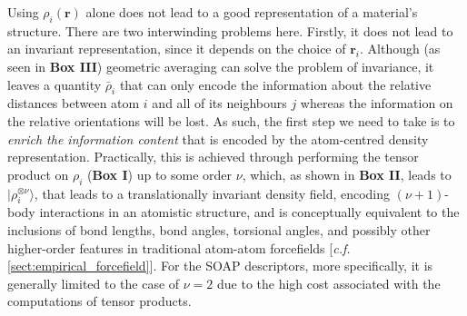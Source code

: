 Using $\rho_i(\bm{r})$ alone does not lead to a good representation of a material's structure. There are two interwinding problems here. Firstly, it does not lead to an invariant representation, since it depends on the choice of $\bm{r}_i$. Although (as seen in \textbf{Box III}) geometric averaging can solve the problem of invariance, it leaves a quantity $\bar{\rho}_i$ that can only encode the information about the relative distances between atom $i$ and all of its neighbours $j$ whereas the information on the relative orientations will be lost. As such, the first step we need to take is to \emph{enrich the information content} that is encoded by the atom-centred density representation. Practically, this is achieved through performing the tensor product on $\rho_i$ (\textbf{Box I}) up to some order $\nu$, which, as shown in \textbf{Box II}, leads to $|\rho^{\otimes \nu}_i\rangle$, that leads to a translationally invariant density field, encoding $(\nu+1)$-body interactions in an atomistic structure, and is conceptually equivalent to the inclusions of bond lengths, bond angles, torsional angles, and possibly other higher-order features in traditional atom-atom forcefields [\emph{c.f.} \cref{sect:empirical_forcefield}]. For the SOAP descriptors, more specifically, it is generally limited to the case of $\nu=2$ due to the high  cost associated with the  computations of tensor products.

